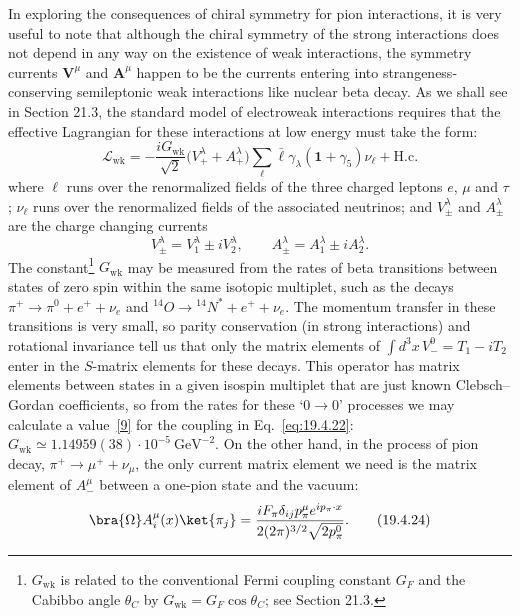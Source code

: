 In exploring the consequences of chiral symmetry for pion interactions, it is very useful to note that although the chiral symmetry of the strong interactions does not depend in any way on the existence of weak interactions, the symmetry currents $\mathbf{V}^\mu$ and $\mathbf{A}^\mu$ happen to be the currents entering into strangeness-conserving semileptonic weak interactions like nuclear beta decay. As we shall see in Section 21.3, the standard model of electroweak interactions requires that the effective Lagrangian for these interactions at low energy must take the form:
\begin{equation}
\mathcal L_{\mathrm{wk}}
=-\frac{iG_{\mathrm{wk}}}{\sqrt2}
\bigl(V_+^\lambda+A_+^\lambda\bigr)
\sum_\ell\bar\ell\gamma_\lambda(\mathbf{1}+\gamma_5)\nu_\ell
+\mathrm{H.c.}
\tag{19.4.22}\label{eq:19.4.22}
\end{equation}
where $\ell$ runs over the renormalized fields of the three charged leptons $e$, $\mu$ and $\tau$; $\nu_\ell$ runs over the renormalized fields of the associated neutrinos; and $V_\pm^\lambda$ and $A_\pm^\lambda$ are the charge changing currents
\begin{equation}
V_\pm^\lambda=V_1^\lambda\pm iV_2^\lambda,
\qquad
A_\pm^\lambda=A_1^\lambda\pm iA_2^\lambda.
\tag{19.4.23}\label{eq:19.4.23}
\end{equation}
The constant\footnote{$G_{\mathrm{wk}}$ is related to the conventional Fermi coupling constant $G_F$ and the Cabibbo angle $\theta_C$ by $G_{\mathrm{wk}}=G_F\cos\theta_C$; see Section 21.3.} $G_{\mathrm{wk}}$ may be measured from the rates of beta transitions between states of zero spin within the same isotopic multiplet, such as the decays $\pi^+\to\pi^0+e^++\nu_e$ and ${}^{14}O\to{}^{14}N^*+e^++\nu_e$. The momentum transfer in these transitions is very small, so parity conservation (in strong interactions) and rotational invariance tell us that only the matrix elements of $\int d^3x\,V_-^0=T_1-iT_2$ enter in the $S$-matrix elements for these decays. This operator has matrix elements between states in a given isospin multiplet that are just known Clebsch--Gordan coefficients, so from the rates for these `$0\to0$' processes we may calculate a value~\hyperref[ch19-ref-9]{[9]} for the coupling in Eq.~\eqref{eq:19.4.22}: $G_{\mathrm{wk}}\simeq1.14959(38)\cdot10^{-5}\ \mathrm{GeV}^{-2}$. On the other hand, in the process of pion decay, $\pi^+\to\mu^++\nu_\mu$, the only current matrix element we need is the matrix element of $A_-^\mu$ between a one-pion state and the vacuum:
\begin{equation}
\bra{\Omega}A_i^\mu(x)\ket{\pi_j}
=\frac{iF_\pi\delta_{ij}p_\pi^\mu
e^{ip_\pi\cdot x}}
{2(2\pi)^{3/2}\sqrt{2p_\pi^0}}.
\tag{19.4.24}\label{eq:19.4.24}
\end{equation}
